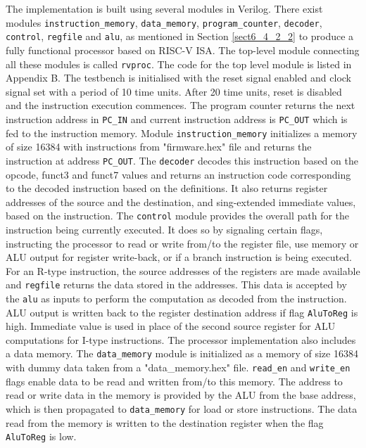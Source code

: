 The implementation is built using several modules in Verilog. There exist modules \verb|instruction_memory|, \verb|data_memory|, \verb|program_counter|, \verb|decoder|, \verb|control|, \verb|regfile| and \verb|alu|, as mentioned in Section \ref{sect6_4_2_2} to produce a fully functional processor based on RISC-V ISA. The top-level module connecting all these modules is called \verb|rvproc|. The code for the top level module is listed in Appendix B.\newline\newline
The testbench is initialised with the reset signal enabled and clock signal set with a period of 10 time units. After 20 time units, reset is disabled and the instruction execution commences. The program counter returns the next instruction address in \verb|PC_IN| and current instruction address is \verb|PC_OUT| which is fed to the instruction memory. Module \verb|instruction_memory|  initializes a memory of size 16384 with instructions from "firmware.hex" file and returns the instruction at address \verb|PC_OUT|. The \verb|decoder| decodes this instruction based on the opcode, funct3 and funct7 values and returns an instruction code corresponding to the decoded instruction based on the definitions. It also returns register addresses of the source and the destination, and sing-extended immediate values, based on the instruction.\newline\newline
The \verb|control| module provides the overall path for the instruction being currently executed. It does so by signaling certain flags, instructing the processor to read or write from/to the register file, use memory or ALU output for register write-back, or if a branch instruction is being executed. For an R-type instruction, the source addresses of the registers are made available and \verb|regfile| returns the data stored in the addresses. This data is accepted by the \verb|alu| as inputs to perform the computation as decoded from the instruction. ALU output is written back to the register destination address if flag \verb|AluToReg| is high. Immediate value is used in place of the second source register for ALU computations for I-type instructions.\newline\newline
The processor implementation also includes a data memory. The \verb|data_memory| module is initialized as a memory of size 16384 with dummy data taken from a "data\_memory.hex" file. \verb|read_en| and \verb|write_en| flags enable data to be read and written from/to this memory. The address to read or write data in the memory is provided by the ALU from the base address, which is then propagated to \verb|data_memory| for load or store instructions. The data read from the memory is written to the destination register when the flag \verb|AluToReg| is low. \newline\newline
